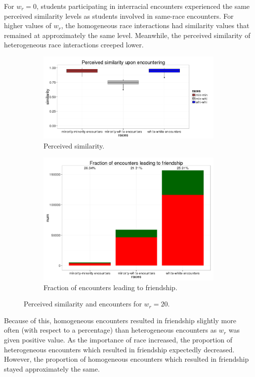 For $w_r=0$, students participating in interracial encounters experienced the same perceived similarity levels as students involved in same-race encounters. For higher values of 
$w_r$, the homogeneous race interactions had similarity values that remained at approximately the same level. Meanwhile, the perceived similarity of heterogeneous race interactions 
creeped lower.
\begin{figure}
\begin{subfigure}{.5\textwidth}
  \centering
    \includegraphics[width=1.2\textwidth]{similarityBoxplots20.png}
      \caption{Perceived similarity.}
\end{subfigure}
\begin{subfigure}{.5\textwidth}
    \includegraphics[width=\textwidth]{encountersGraph20.png}
      \caption{Fraction of encounters leading to friendship.}
\end{subfigure}
\caption{Perceived similarity and encounters for $w_r=20$.}
\end{figure}
Because of this, homogeneous encounters resulted in friendship slightly more 
often (with respect to a percentage) than heterogeneous encounters as $w_r$ was given positive value. As the importance of race increased, the proportion 
of heterogeneous encounters which resulted in friendship expectedly decreased. However, the proportion of homogeneous encounters 
which resulted in friendship stayed approximately the same.

